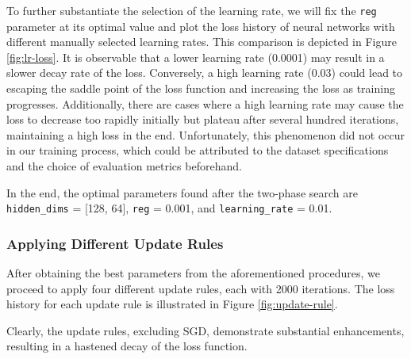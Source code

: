 \documentclass[10pt,a4paper,twoside]{tau}
\begin{document}
To further substantiate the selection of the learning rate, we will fix the \texttt{reg} parameter at its optimal value and plot the loss history of neural networks with different manually selected learning rates. This comparison is depicted in Figure \ref{fig:lr-loss}. It is observable that a lower learning rate (0.0001) may result in a slower decay rate of the loss. Conversely, a high learning rate (0.03) could lead to escaping the saddle point of the loss function and increasing the loss as training progresses. Additionally, there are cases where a high learning rate may cause the loss to decrease too rapidly initially but plateau after several hundred iterations, maintaining a high loss in the end. Unfortunately, this phenomenon did not occur in our training process, which could be attributed to the dataset specifications and the choice of evaluation metrics beforehand.

In the end, the optimal parameters found after the two-phase search are \texttt{hidden\_dims} = [128, 64], \texttt{reg} = 0.001, and \texttt{learning\_rate} = 0.01.


\subsubsection{Applying Different Update Rules}

After obtaining the best parameters from the aforementioned procedures, we proceed to apply four different update rules, each with 2000 iterations. The loss history for each update rule is illustrated in Figure \ref{fig:update-rule}.

Clearly, the update rules, excluding SGD, demonstrate substantial enhancements, resulting in a hastened decay of the loss function.
\end{document}
